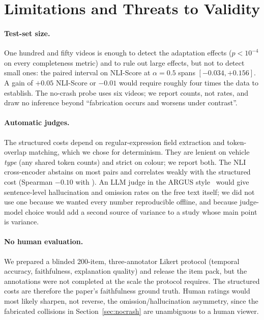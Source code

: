 \section{Limitations and Threats to Validity}
\label{sec:limitations}

\paragraph{Test-set size.}
One hundred and fifty videos is enough to detect the adaptation effects ($p<10^{-4}$ on every completeness metric) and to rule out large \tcd{} effects, but not to detect small ones: the paired interval on NLI-Score at $\alpha{=}0.5$ spans $[-0.034,+0.156]$.
A \tcd{} gain of $+0.05$ NLI-Score or $-0.01$ \Hcost{} would require roughly four times the data to establish.
The no-crash probe uses six videos; we report counts, not rates, and draw no inference beyond ``fabrication occurs and worsens under contrast''.

\paragraph{Automatic judges.}
The structured costs depend on regular-expression field extraction and token-overlap matching, which we chose for determinism.
They are lenient on vehicle \emph{type} (any shared token counts) and strict on colour; we report both.
The NLI cross-encoder abstains on most pairs and correlates weakly with the structured cost (Spearman $-0.10$ with \Hcost{}).
An LLM judge in the ARGUS style~\cite{argus2025} would give sentence-level hallucination and omission rates on the free text itself; we did not use one because we wanted every number reproducible offline, and because judge-model choice would add a second source of variance to a study whose main point is variance.

\paragraph{No human evaluation.}
We prepared a blinded 200-item, three-annotator Likert protocol (temporal accuracy, faithfulness, explanation quality) and release the item pack, but the annotations were not completed at the scale the protocol requires.
The structured costs are therefore the paper's faithfulness ground truth.
Human ratings would most likely sharpen, not reverse, the omission/hallucination asymmetry, since the fabricated collisions in Section~\ref{sec:nocrash} are unambiguous to a human viewer.

